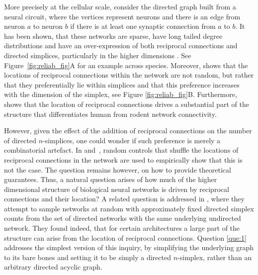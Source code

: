 \documentclass[9pt,a4paper,oneside]{article}
\begin{document}
More precisely at the cellular scale, consider the directed graph built from a neural circuit, where the vertices represent neurons and there is an edge from neuron $a$ to neuron $b$ if there is at least one synaptic connection from $a$ to $b$.  It has been shown, that these networks are sparse, have long tailed degree distributions and have an over-expression of both reciprocal connections and directed simplices, particularly in the higher dimensions \cite{towlson2013rich, sizemore2019importance, reimann2024modeling, santander2025heterogeneous}.  See Figure~\ref{fig:reliab_fig}A for an example across species.
Moreover, \cite{santander2025heterogeneous} shows that the locations of reciprocal connections within the network are not random, but rather that they preferentially lie within simplices and that this preference increases with the dimension of the simplex, see Figure \ref{fig:reliab_fig}B.  Furthermore, \cite{BarrosHumanvRat} shows that the location of reciprocal connections drives a substantial part of the structure that differentiates human from rodent network connectivity.

However, given the effect of the addition of reciprocal connections on the number of directed $n$-simplices, one could wonder if such preference is merely a combinatorial artefact.
In \cite{santander2025heterogeneous} and~\cite{SantoroThesis}, random controls that shuffle the locations of reciprocal connections in the network are used to empirically show that this is not the case.
The question remains however, on how to provide theoretical guarantees.  
Thus, a natural question arises of how much of the higher dimensional structure of biological neural networks is driven by reciprocal connections and their location?
A related question is addressed in \cite{unger2024mcmc}, where they attempt to sample networks at random with approximately fixed directed simplex counts from the set of directed networks with the same underlying undirected network. They found indeed, that for certain architectures a large part of the structure can arise from the location of reciprocal connections. 
Question \ref{que:1} addresses the simplest version of this inquiry, by simplifying the underlying graph to its bare bones and setting it to be simply a directed $n$-simplex, rather than an arbitrary directed acyclic graph. 
\end{document}

